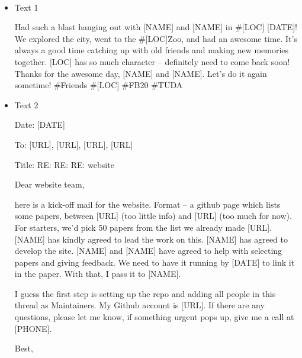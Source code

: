 \documentclass[a4 paper]{article}
\numberwithin{equation}{section}
\newcommand{\problem}[2]{~\\\fbox{\textbf{Problem #1}}\newline\newline}
\newcommand{\0}{\mathbf{0}}
\begin{document}
\pagebreak

\problem{3}{}

\begin{itemize}
    \item Text 1

    Had such a blast hanging out with [NAME] and [NAME] in \#[LOC] [DATE]! We explored the city, went to the \#[LOC]Zoo, and had an awesome time. It’s always a good time catching up with old friends and making new memories together. [LOC] has so much character – definitely need to come back soon! Thanks for the awesome day, [NAME] and [NAME]. Let’s do it again sometime! \#Friends \#[LOC] \#FB20 \#TUDA


    \item Text 2
        
        Date: [DATE]
        
        To: [URL], [URL], [URL], [URL]
        
        Title: RE: RE: RE: website
        
        Dear website team,
        
        here is a kick-off mail for the website. Format – a github page which lists some papers, between [URL] (too little info) and [URL] (too much for now). For starters, we’d pick 50 papers from the list we already made [URL]. [NAME] has kindly agreed to lead the work on this. [NAME] has agreed to develop the site. [NAME] and [NAME] have agreed to help with selecting papers and giving feedback. We need to have it running by [DATE] to link it in the paper. With that, I pass it to [NAME].
        
        I guess the first step is setting up the repo and adding all people in this thread as Maintainers. My Github account is [URL]. If there are any questions, please let me know, if something urgent pops up, give me a call at [PHONE].
        
        Best,
        
\end{itemize}
\end{document}
